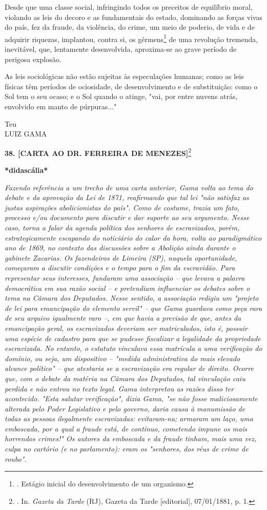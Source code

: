 Desde que uma classe social, infringindo todos os preceitos de
equilíbrio moral, violando as leis do decoro e as fundamentais do
estado, dominando as forças vivas do país, fez da fraude, da violência,
do crime, um meio de poderio, de vida e de adquirir riquezas, implantou,
contra si, os gérmens\footnote{. Estágio inicial do desenvolvimento de
  um organismo.} de uma
revolução tremenda, inevitável, que, lentamente desenvolvida,
aproxima-se ao grave período de perigosa explosão.

As leis sociológicas não estão sujeitas às especulações humanas; como as
leis físicas têm períodos de ociosidade, de desenvolvimento e de
substituição: como o Sol tem o seu ocaso; e o Sol quando o atinge, "vai,
por entre nuvens atrás, envolvido em manto de púrpuras..."

Teu\\
LUIZ GAMA

\textbf{38. {[}CARTA AO DR. FERREIRA DE MENEZES{]}}\footnote{. In.
  \emph{Gazeta da Tarde} (RJ), Gazeta da Tarde {[}editorial{]},
  07/01/1881, p. 1.}

\textbf{*didascália*}

\emph{Fazendo referência a um trecho de uma carta anterior, Gama volta
ao tema do debate e da aprovação da Lei de 1871, reafirmando que tal lei
"não satisfaz as justas aspirações abolicionistas do país". Como de
costume, trazia um fato, processo e/ou documento para discutir e dar
suporte ao seu argumento. Nesse caso, torna a falar da agenda política
dos senhores de escravizados, porém, estrategicamente escapando do
noticiário do calor da hora, volta ao paradigmático ano de 1869, no
contexto das discussões sobre a Abolição ainda durante o gabinete
Zacarias. Os fazendeiros de Limeira (SP), naquela oportunidade,
começaram a discutir condições e o tempo para o fim da escravidão. Para
representar seus interesses, fundaram uma associação -- que levava a
palavra democrática em sua razão social -- e pretendiam influenciar os
debates sobre o tema na Câmara dos Deputados. Nesse sentido, a
associação redigiu um "projeto de lei para emancipação do elemento
servil" -- que Gama guardava como peça rara de seu arquivo igualmente
raro --, em que havia a previsão de que, antes da emancipação geral, os
escravizados deveriam ser matriculados, isto é, possuir uma espécie de
cadastro para que se pudesse fiscalizar a legalidade da propriedade
escravizada. No entanto, o estatuto vinculava essa matrícula a uma
verificação do domínio, ou seja, um dispositivo -- "medida
administrativa do mais elevado alcance político" -- que atestaria se a
escravização era regular de direito. Ocorre que, com o debate da matéria
na Câmara dos Deputados, tal vinculação caiu perdida e não entrou no
texto legal. Gama interpretou as razões disso ter acontecido. "Esta
salutar verificação", dizia Gama, "se não fosse maliciosamente alterada
pelo Poder Legislativo e pelo governo, daria causa à manumissão de todas
as pessoas ilegalmente escravizadas: evitaram-na; armaram um laço, uma
emboscada, por a qual a fraude está, de contínuo, cometendo impune os
mais horrendos crimes!" Os autores da emboscada e da fraude tinham, mais
uma vez, culpa no cartório (e no parlamento): eram os "senhores, dos
réus de crime de roubo".}

